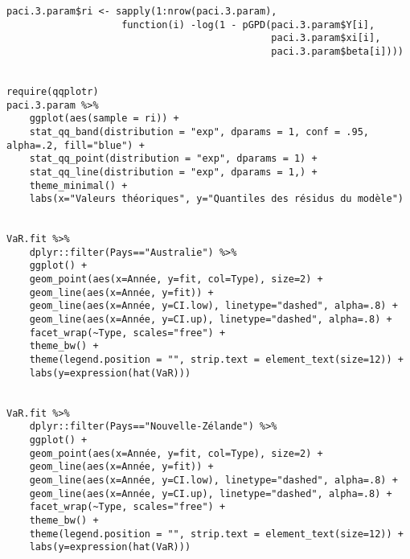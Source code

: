 \begin{lstlisting}
paci.3.param$ri <- sapply(1:nrow(paci.3.param), 
                    function(i) -log(1 - pGPD(paci.3.param$Y[i], 
                                              paci.3.param$xi[i], 
                                              paci.3.param$beta[i])))


require(qqplotr)
paci.3.param %>% 
    ggplot(aes(sample = ri)) +
    stat_qq_band(distribution = "exp", dparams = 1, conf = .95, alpha=.2, fill="blue") +
    stat_qq_point(distribution = "exp", dparams = 1) + 
    stat_qq_line(distribution = "exp", dparams = 1,) + 
    theme_minimal() +
    labs(x="Valeurs théoriques", y="Quantiles des résidus du modèle")
    
    
VaR.fit %>% 
    dplyr::filter(Pays=="Australie") %>% 
    ggplot() + 
    geom_point(aes(x=Année, y=fit, col=Type), size=2) + 
    geom_line(aes(x=Année, y=fit)) + 
    geom_line(aes(x=Année, y=CI.low), linetype="dashed", alpha=.8) + 
    geom_line(aes(x=Année, y=CI.up), linetype="dashed", alpha=.8) + 
    facet_wrap(~Type, scales="free") + 
    theme_bw() + 
    theme(legend.position = "", strip.text = element_text(size=12)) +
    labs(y=expression(hat(VaR)))
    
    
VaR.fit %>% 
    dplyr::filter(Pays=="Nouvelle-Zélande") %>% 
    ggplot() + 
    geom_point(aes(x=Année, y=fit, col=Type), size=2) + 
    geom_line(aes(x=Année, y=fit)) + 
    geom_line(aes(x=Année, y=CI.low), linetype="dashed", alpha=.8) + 
    geom_line(aes(x=Année, y=CI.up), linetype="dashed", alpha=.8) + 
    facet_wrap(~Type, scales="free") + 
    theme_bw() + 
    theme(legend.position = "", strip.text = element_text(size=12)) +
    labs(y=expression(hat(VaR)))                                                               
\end{lstlisting}